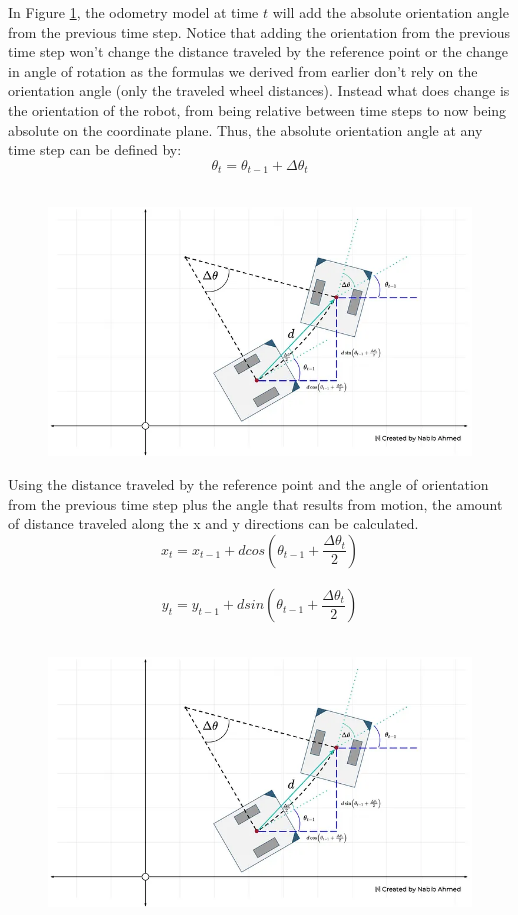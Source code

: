 In Figure \ref{fig:thetat}, the odometry model at time $t$ will add the absolute orientation angle from the previous time step. Notice that adding the orientation from the previous time step won’t change the distance traveled by the reference point or the change in angle of rotation as the formulas we derived from earlier don’t rely on the orientation angle (only the traveled wheel distances). Instead what does change is the orientation of the robot, from being relative between time steps to now being absolute on the coordinate plane. Thus, the absolute orientation angle at any time step can be defined by:
\begin{equation}\label{eq:8}
    \theta_t = \theta_{t-1} + \Delta \theta_t
\end{equation}\\
\begin{figure}[H]
	\centering
	\includegraphics[width=0.8\linewidth]{figures/theta t.png}
	\caption{}
	\label{fig:thetat}
\end{figure} 

Using the distance traveled by the reference point and the angle of orientation from the previous time step plus the angle that results from motion, the amount of distance traveled along the x and y directions can be calculated.
\begin{equation}\label{eq:9}
    x_t = x_{t-1} + d cos(\theta_{t-1} + \frac{\Delta \theta_t}{2})
\end{equation}\\
\begin{equation}\label{eq:10}
    y_t = y_{t-1} + d sin(\theta_{t-1} + \frac{\Delta \theta_t}{2})
\end{equation}\\
\begin{figure}[H]
	\centering
	\includegraphics[width=0.8\linewidth]{figures/xtyt.png}
	\caption{}
	\label{fig:xtyt}
\end{figure} 


